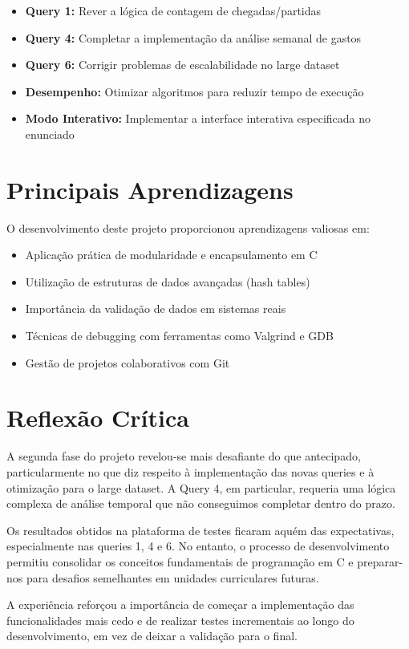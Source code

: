 \documentclass[a4paper,12pt]{scrreprt}
\begin{document}
\begin{itemize}
    \item \textbf{Query 1:} Rever a lógica de contagem de chegadas/partidas
    \item \textbf{Query 4:} Completar a implementação da análise semanal de gastos
    \item \textbf{Query 6:} Corrigir problemas de escalabilidade no large dataset
    \item \textbf{Desempenho:} Otimizar algoritmos para reduzir tempo de execução
    \item \textbf{Modo Interativo:} Implementar a interface interativa especificada no enunciado
\end{itemize}

\section{Principais Aprendizagens}

O desenvolvimento deste projeto proporcionou aprendizagens valiosas em:

\begin{itemize}
    \item Aplicação prática de modularidade e encapsulamento em C
    \item Utilização de estruturas de dados avançadas (hash tables)
    \item Importância da validação de dados em sistemas reais
    \item Técnicas de debugging com ferramentas como Valgrind e GDB
    \item Gestão de projetos colaborativos com Git
\end{itemize}

\section{Reflexão Crítica}

A segunda fase do projeto revelou-se mais desafiante do que antecipado, particularmente no que diz respeito à implementação das novas queries e à otimização para o large dataset. A Query 4, em particular, requeria uma lógica complexa de análise temporal que não conseguimos completar dentro do prazo.

Os resultados obtidos na plataforma de testes ficaram aquém das expectativas, especialmente nas queries 1, 4 e 6. No entanto, o processo de desenvolvimento permitiu consolidar os conceitos fundamentais de programação em C e preparar-nos para desafios semelhantes em unidades curriculares futuras.

A experiência reforçou a importância de começar a implementação das funcionalidades mais cedo e de realizar testes incrementais ao longo do desenvolvimento, em vez de deixar a validação para o final.
\end{document}
